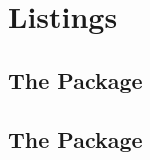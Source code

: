 \section{Listings}

\subsection{The  Package}
\begin{frame}

\end{frame}

\subsection{The  Package}
\begin{frame}

\end{frame}